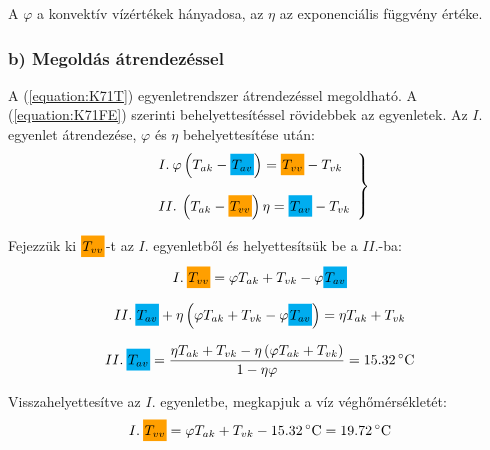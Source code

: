 A $\varphi$ a konvektív vízértékek hányadosa, az $\eta$ az exponenciális függvény értéke.

\subsubsection*{b) Megoldás átrendezéssel}
A (\ref{equation:K71T}) egyenletrendszer átrendezéssel megoldható. A (\ref{equation:K71FE}) szerinti behelyettesítéssel rövidebbek az egyenletek.
Az $I.$ egyenlet átrendezése, $\varphi$ és $\eta$ behelyettesítése után:
\begin{equation}
	\label{equation:K71TT}
	\left.
	\begin{array}{l}
		I.\: \varphi \left( T_{ak} - \highlight{cyan}{T_{av}} \right) 
		= 
		\highlight{orange!75!yellow}{T_{vv}} - T_{vk} 
	\\ \\
		II.\: \left(T_{ak} - \highlight{orange!75!yellow}{T_{vv}}\right) \eta = \highlight{cyan}{T_{av}} - T_{vk}
	\end{array}
\right\rbrace
\end{equation}

Fejezzük ki $\highlight{orange!75!yellow}{T_{vv}}$-t az $I.$ egyenletből és helyettesítsük be a $II.$-ba:
\begin{equation}
	\label{equation:K71TVV}
	I.\: \highlight{orange!75!yellow}{T_{vv}} = \varphi T_{ak} + T_{vk} - \varphi \highlight{cyan}{T_{av}} 
\end{equation}

\begin{equation}
	II.\: \highlight{cyan}{T_{av}} + \eta \left(\varphi T_{ak} + T_{vk} - \varphi \highlight{cyan}{T_{av}}\right) = \eta T_{ak} + T_{vk}
\end{equation}

\begin{equation}
	\label{equation:K71TAV}
	II.\: \highlight{cyan}{T_{av}} = \dfrac{
		\eta T_{ak} + T_{vk} - \eta \left(\varphi T_{ak} + T_{vk}\right)
		}{
		1-\eta \varphi
		}
	= 
	\SI{15.32}{\celsius}
\end{equation}

Visszahelyettesítve az $I.$ egyenletbe, megkapjuk a víz véghőmérsékletét:
\begin{equation}
	I.\: \highlight{orange!75!yellow}{T_{vv}} = \varphi T_{ak} + T_{vk} - \SI{15.32}{\celsius} =  \SI{19.72}{\celsius} 
\end{equation}


